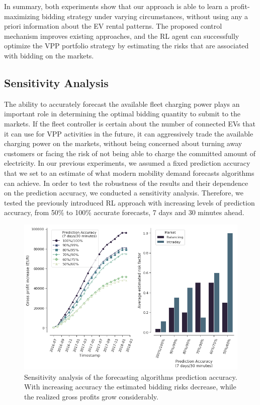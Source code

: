 \documentclass[a4paper, 12pt]{article}
\begin{document}
In summary, both experiments show that our approach is able to learn a
profit-maximizing bidding strategy under varying circumstances, without using
any a priori information about the EV rental patterns. The proposed control
mechanism improves existing approaches, and the RL agent can successfully
optimize the VPP portfolio strategy by estimating the risks that are associated
with bidding on the markets.

\subsection{Sensitivity Analysis}
\label{sec:org3d19e35}
The ability to accurately forecast the available fleet charging power plays an
important role in determining the optimal bidding quantity to submit to the
markets. If the fleet controller is certain about the number of connected EVs
that it can use for VPP activities in the future, it can aggressively trade the
available charging power on the markets, without being concerned about turning
away customers or facing the risk of not being able to charge the committed
amount of electricity. In our previous experiments, we assumed a fixed
prediction accuracy that we set to an estimate of what modern mobility demand
forecasts algorithms can achieve. In order to test the robustness of the results
and their dependence on the prediction accuracy, we conducted a sensitivity
analysis. Therefore, we tested the previously introduced RL approach with
increasing levels of prediction accuracy, from 50\% to 100\% accurate forecasts, 7
days and 30 minutes ahead.

\begin{figure}[htb]
\centering
\includegraphics[width=1\linewidth]{fig/rl-accuracy.png}
\caption[Sensivity Analysis of Prediction Accuracy]{Sensitivity analysis of the forecasting algorithms prediction accuracy. With increasing accuracy the estimated bidding risks decrease, while the realized gross profits grow considerably. \label{fig-sens-accuracy}}
\end{figure}
\end{document}

